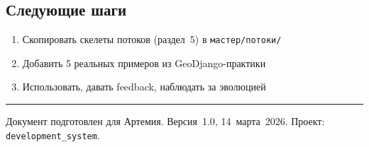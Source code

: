 \documentclass[12pt, a4paper, twoside]{article}
\begin{document}
\subsection{Следующие шаги}

\begin{enumerate}[leftmargin=1.5em]
  \item Скопировать скелеты потоков (раздел~5) в \texttt{мастер/потоки/}
  \item Добавить 5 реальных примеров из GeoDjango-практики
  \item Использовать, давать feedback, наблюдать за эволюцией
\end{enumerate}

\vspace{1cm}
\hrule
\vspace{4mm}
{\small\color{MidGray}
  Документ подготовлен для Артемия.
  Версия~1.0, 14~марта~2026.
  Проект: \texttt{development\_system}.
}
\end{document}
